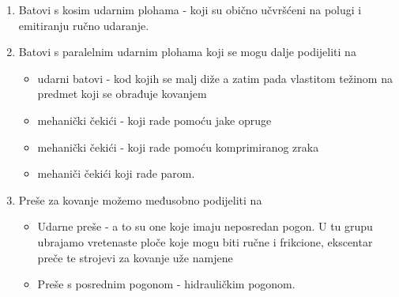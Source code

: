 \documentclass[a4paper,12pt]{article}
\numberwithin{figure}{section}
\begin{document}
\begin{enumerate}
\item Batovi s kosim udarnim plohama - koji su obično učvršćeni na polugi i emitiranju ručno udaranje.
\item Batovi s paralelnim udarnim plohama koji se mogu dalje podijeliti na 
\begin{itemize}
\item udarni batovi - kod kojih se malj diže a zatim pada vlastitom težinom na predmet koji se obrađuje kovanjem
\item mehanički čekići - koji rade pomoću jake opruge
\item mehanički čekići - koji rade pomoću komprimiranog zraka
\item mehaniči čekići koji rade parom.
\end{itemize}
\item Preše za kovanje možemo međusobno podijeliti na 
\begin{itemize}
\item Udarne preše - a to su one koje imaju neposredan pogon. U tu grupu ubrajamo vretenaste ploče koje mogu biti ručne i frikcione, ekscentar preče te strojevi za kovanje uže namjene
\item Preše s posrednim pogonom - hidrauličkim pogonom.
\end{itemize}
\end{enumerate}
\end{document}
